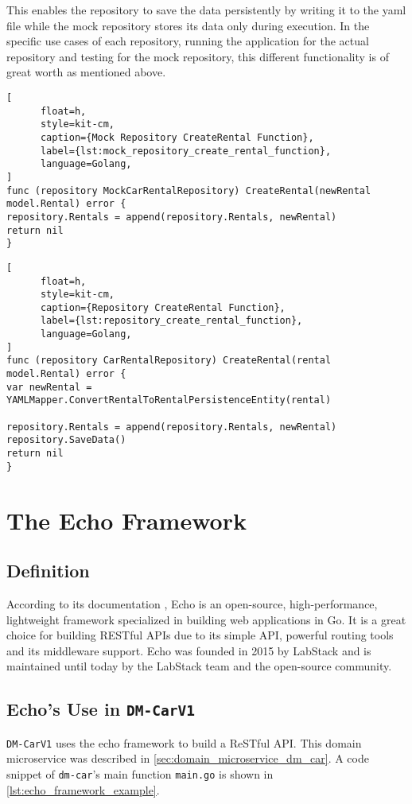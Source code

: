 This enables the repository to save the data persistently by writing it to the yaml file while the mock repository stores its data only during execution.
In the specific use cases of each repository, running the application for the actual repository and testing for the mock repository, this different functionality is of great worth as mentioned above.

\begin{lstlisting}[
      float=h,
      style=kit-cm,
      caption={Mock Repository CreateRental Function},
      label={lst:mock_repository_create_rental_function},
      language=Golang,
]
func (repository MockCarRentalRepository) CreateRental(newRental model.Rental) error {
repository.Rentals = append(repository.Rentals, newRental)
return nil
}
\end{lstlisting}

\begin{lstlisting}[
      float=h,
      style=kit-cm,
      caption={Repository CreateRental Function},
      label={lst:repository_create_rental_function},
      language=Golang,
]
func (repository CarRentalRepository) CreateRental(rental model.Rental) error {
var newRental = YAMLMapper.ConvertRentalToRentalPersistenceEntity(rental)

repository.Rentals = append(repository.Rentals, newRental)
repository.SaveData()
return nil
}
\end{lstlisting}

\section{The Echo Framework}
\label{sec:the_echo_framework}
\subsection{Definition}
According to its documentation \cite{ECH-DOC}, Echo is an open-source, high-performance, lightweight framework specialized in building web applications in Go.
It is a great choice for building RESTful APIs due to its simple API, powerful routing tools and its middleware support.
Echo was founded in 2015 by LabStack and is maintained until today by the LabStack team and the open-source community.

\subsection{Echo's Use in \texttt{DM-CarV1}}
\texttt{DM-CarV1} uses the echo framework to build a ReSTful API.
This domain microservice was described in \autoref*{sec:domain_microservice_dm_car}.
A code snippet of \texttt{dm-car}'s main function \texttt{main.go} is shown in \autoref{lst:echo_framework_example}.

